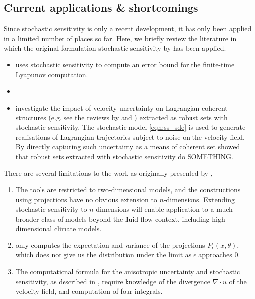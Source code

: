 \subsection{Current applications \& shortcomings}
Since stochastic sensitivity is only a recent development, it has only been applied in a limited number of places so far.
Here, we briefly review the literature in which the original formulation stochastic sensitivity by \citet{Balasuriya_2020_StochasticSensitivityComputable} has been applied.

\begin{itemize}
	\item \citet{Balasuriya_2020_UncertaintyFinitetimeLyapunov} uses stochastic sensitivity to compute an error bound for the finite-time Lyapunov computation.


	\item \citet{FangEtAl_2020_DisentanglingResolutionPrecision}


	\item \citet{BadzaEtAl_2023_HowSensitiveAre} investigate the impact of velocity uncertainty on Lagrangian coherent structures (e.g. see the reviews by \citet{BalasuriyaEtAl_2018_GeneralizedLagrangianCoherent} and \citet{HadjighasemEtAl_2017_CriticalComparisonLagrangian}) extracted as robust sets with stochastic sensitivity.
	      The stochastic model \eqref{eqn:ss_sde} is used to generate realisations of Lagrangian trajectories subject to noise on the velocity field.
	      By directly capturing such uncertainty as a means of coherent set \citet{BadzaEtAl_2023_HowSensitiveAre} showed that robust sets extracted with stochastic sensitivity do SOMETHING.

\end{itemize}
There are several limitations to the work as originally presented by \citet{Balasuriya_2020_StochasticSensitivityComputable},
\begin{enumerate}
	\item The tools are restricted to two-dimensional models, and the constructions using projections have no obvious extension to \(n\)-dimensions.
	      Extending stochastic sensitivity to \(n\)-dimensions will enable application to a much broader class of models beyond the fluid flow context, including high-dimensional climate models.

	\item \citet{Balasuriya_2020_StochasticSensitivityComputable} only computes the expectation and variance of the projections \(P_\epsilon(x,\theta)\), which does not give us the distribution under the limit as \(\epsilon\) approaches 0.

	\item The computational formula for the anisotropic uncertainty and stochastic sensitivity, as described in , require knowledge of the divergence \(\nabla\cdot u\) of the velocity field, and computation of four integrals.
\end{enumerate}

